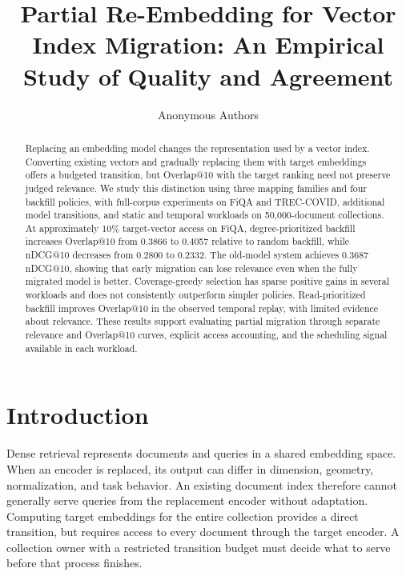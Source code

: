 \documentclass[runningheads]{llncs}
\begin{document}
\title{Partial Re-Embedding for Vector Index Migration: An Empirical Study of Quality and Agreement}
\author{Anonymous Authors}
\maketitle

\begin{abstract}
Replacing an embedding model changes the representation used by a vector index. Converting existing vectors and gradually replacing them with target embeddings offers a budgeted transition, but Overlap@10 with the target ranking need not preserve judged relevance. We study this distinction using three mapping families and four backfill policies, with full-corpus experiments on FiQA and TREC-COVID, additional model transitions, and static and temporal workloads on 50,000-document collections. At approximately 10\% target-vector access on FiQA, degree-prioritized backfill increases Overlap@10 from 0.3866 to 0.4057 relative to random backfill, while nDCG@10 decreases from 0.2800 to 0.2332. The old-model system achieves 0.3687 nDCG@10, showing that early migration can lose relevance even when the fully migrated model is better. Coverage-greedy selection has sparse positive gains in several workloads and does not consistently outperform simpler policies. Read-prioritized backfill improves Overlap@10 in the observed temporal replay, with limited evidence about relevance. These results support evaluating partial migration through separate relevance and Overlap@10 curves, explicit access accounting, and the scheduling signal available in each workload.
\end{abstract}

\section{Introduction}

Dense retrieval represents documents and queries in a shared embedding space. When an encoder is replaced, its output can differ in dimension, geometry, normalization, and task behavior. An existing document index therefore cannot generally serve queries from the replacement encoder without adaptation. Computing target embeddings for the entire collection provides a direct transition, but requires access to every document through the target encoder. A collection owner with a restricted transition budget must decide what to serve before that process finishes.
\end{document}
